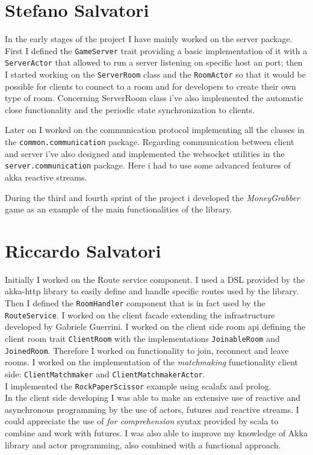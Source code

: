 \section{Stefano Salvatori}
In the early stages of the project I have mainly worked on the server package. First I defined the \texttt{GameServer} trait providing a basic implementation of it with a \texttt{ServerActor} that allowed to run a server listening on specific host an port; then I started working on the \texttt{ServerRoom} class and the \texttt{RoomActor} so that it would be possible for clients to connect to a room and for developers to create their own type of room. Concerning ServerRoom class i've also implemented the automatic close functionality and the periodic state synchronization to clients.

Later on I worked on the communication protocol implementing all the classes in the \texttt{common.communication} package. Regarding communication between client and server i've also designed and implemented the websocket utilities in the \texttt{server.communication} package. Here i had to use some advanced features of akka reactive streams. 

During the third and fourth sprint of the project i developed the \textit{MoneyGrabber} game as an example of the main functionalities of the library. 



\section{Riccardo Salvatori}
Initially I worked on the Route service component. I used a DSL provided by the akka-http library to easily define and handle specific routes used by the library. Then I defined the \texttt{RoomHandler} component that is in fact used by the \texttt{RouteService}.
I worked on the client facade extending the infrastructure developed by Gabriele Guerrini. I worked on the client side room api defining the client room trait \texttt{ClientRoom} with the implementations \texttt{JoinableRoom} and \texttt{JoinedRoom}. Therefore I worked on functionality to join, reconnect and leave rooms.
I worked on the implementation of the \textit{matchmaking} functionality client side: \texttt{ClientMatchmaker} and \texttt{ClientMatchmakerActor}.
\\
I implemented the \texttt{RockPaperScissor} example using scalafx and prolog.
\\
In the client side developing I was able to make an extensive use of reactive and asynchronous programming by the use of actors, futures and reactive streams.
I could appreciate the use of \textit{for comprehension} syntax provided by scala to combine and work with futures.
I was also able to improve my knowledge of Akka library and actor programming, also combined with a functional approach.

